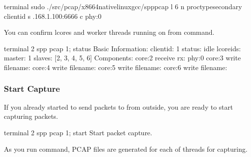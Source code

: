 \documentclass[a4paper,11pt,openany,oneside,english]{sphinxmanual}
\begin{document}
\begin{sphinxVerbatim}[commandchars=\\\{\},formatcom=\footnotesize]
 terminal 
 sudo ./src/pcap/x86\PYGZus{}64\PYGZhy{}native\PYGZhy{}linux\PYGZhy{}gcc/spp\PYGZus{}pcap 
   \PYGZhy{}l \PYGZhy{}6 \PYGZhy{}n  \PYGZhy{}\PYGZhy{}proc\PYGZhy{}typesecondary 
   \PYGZhy{}\PYGZhy{} 
   \PYGZhy{}\PYGZhy{}client\PYGZhy{}id  \PYGZhy{}s .168.1.100:6666 
   \PYGZhy{}c phy:0
\end{sphinxVerbatim}

You can confirm lcores and worker threads running on from  command.

\begin{sphinxVerbatim}[commandchars=\\\{\},formatcom=\footnotesize]
\PYGZsh{} terminal 2
spp \PYGZgt{} pcap 1; status
Basic Information:
  \PYGZhy{} client\PYGZhy{}id: 1
  \PYGZhy{} status: idle
  \PYGZhy{} lcore\PYGZus{}ids:
    \PYGZhy{} master: 1
    \PYGZhy{} slaves: [2, 3, 4, 5, 6]
Components:
  \PYGZhy{} core:2 receive
    \PYGZhy{} rx: phy:0
  \PYGZhy{} core:3 write
    \PYGZhy{} filename:
  \PYGZhy{} core:4 write
    \PYGZhy{} filename:
  \PYGZhy{} core:5 write
    \PYGZhy{} filename:
  \PYGZhy{} core:6 write
    \PYGZhy{} filename:
\end{sphinxVerbatim}


\subsubsection{Start Capture}
\label{\detokenize{usecases/spp_pcap:start-capture}}\label{\detokenize{usecases/spp_pcap:spp-pcap-use-case-start-capture}}
If you already started to send packets to  from outside,
you are ready to start capturing packets.

\begin{sphinxVerbatim}[commandchars=\\\{\},formatcom=\footnotesize]
\PYGZsh{} terminal 2
spp \PYGZgt{} pcap 1; start
Start packet capture.
\end{sphinxVerbatim}

As you run  command, PCAP files are generated for each of
 threads for capturing.
\end{document}
